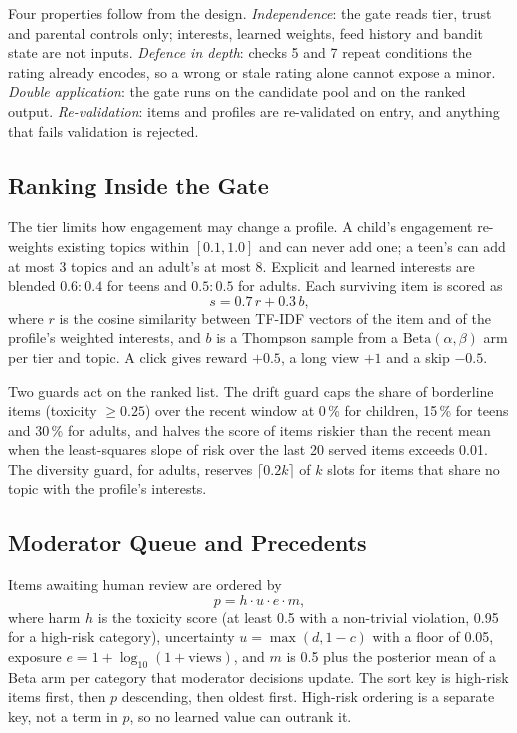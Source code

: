 \documentclass[conference]{IEEEtran}
\newcommand{\pct}{\,\%}
\begin{document}
Four properties follow from the design. \emph{Independence}: the gate reads tier, trust and parental controls only; interests, learned weights, feed history and bandit state are not inputs. \emph{Defence in depth}: checks 5 and 7 repeat conditions the rating already encodes, so a wrong or stale rating alone cannot expose a minor. \emph{Double application}: the gate runs on the candidate pool and on the ranked output. \emph{Re-validation}: items and profiles are re-validated on entry, and anything that fails validation is rejected.

\subsection{Ranking Inside the Gate}

The tier limits how engagement may change a profile. A child's engagement re-weights existing topics within $[0.1, 1.0]$ and can never add one; a teen's can add at most 3 topics and an adult's at most 8. Explicit and learned interests are blended $0.6{:}0.4$ for teens and $0.5{:}0.5$ for adults. Each surviving item is scored as
\begin{equation}
s = 0.7\, r + 0.3\, b ,
\end{equation}
where $r$ is the cosine similarity between TF-IDF vectors of the item and of the profile's weighted interests, and $b$ is a Thompson sample from a $\mathrm{Beta}(\alpha, \beta)$ arm per tier and topic. A click gives reward $+0.5$, a long view $+1$ and a skip $-0.5$.

Two guards act on the ranked list. The drift guard caps the share of borderline items (toxicity $\ge 0.25$) over the recent window at 0\pct{} for children, 15\pct{} for teens and 30\pct{} for adults, and halves the score of items riskier than the recent mean when the least-squares slope of risk over the last 20 served items exceeds 0.01. The diversity guard, for adults, reserves $\lceil 0.2k \rceil$ of $k$ slots for items that share no topic with the profile's interests.

\subsection{Moderator Queue and Precedents}

Items awaiting human review are ordered by
\begin{equation}
p = h \cdot u \cdot e \cdot m ,
\end{equation}
where harm $h$ is the toxicity score (at least 0.5 with a non-trivial violation, 0.95 for a high-risk category), uncertainty $u = \max(d, 1 - c)$ with a floor of 0.05, exposure $e = 1 + \log_{10}(1 + \text{views})$, and $m$ is 0.5 plus the posterior mean of a Beta arm per category that moderator decisions update. The sort key is high-risk items first, then $p$ descending, then oldest first. High-risk ordering is a separate key, not a term in $p$, so no learned value can outrank it.
\end{document}
